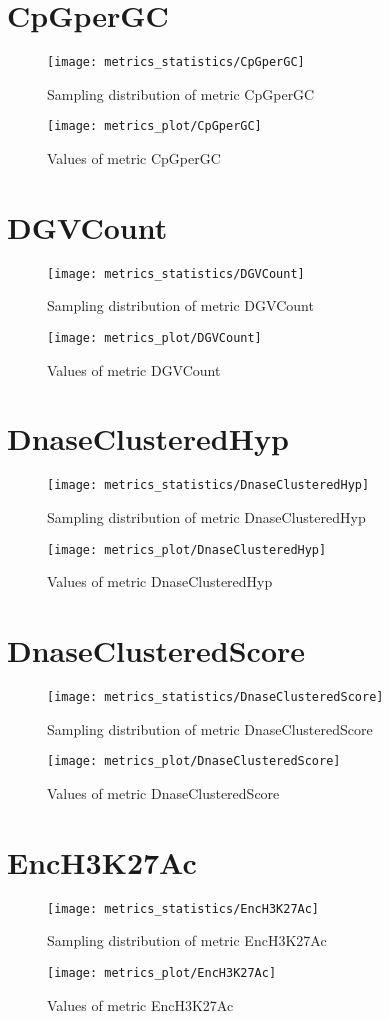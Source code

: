 \section{CpGperGC}
\begin{figure}
  \texttt{[image: metrics\_statistics/CpGperGC]}
  \caption{Sampling distribution of metric CpGperGC}
\end{figure}
\begin{figure}
  \texttt{[image: metrics\_plot/CpGperGC]}
  \caption{Values of metric CpGperGC}
\end{figure}
\section{DGVCount}
\begin{figure}
  \texttt{[image: metrics\_statistics/DGVCount]}
  \caption{Sampling distribution of metric DGVCount}
\end{figure}
\begin{figure}
  \texttt{[image: metrics\_plot/DGVCount]}
  \caption{Values of metric DGVCount}
\end{figure}
\section{DnaseClusteredHyp}
\begin{figure}
  \texttt{[image: metrics\_statistics/DnaseClusteredHyp]}
  \caption{Sampling distribution of metric DnaseClusteredHyp}
\end{figure}
\begin{figure}
  \texttt{[image: metrics\_plot/DnaseClusteredHyp]}
  \caption{Values of metric DnaseClusteredHyp}
\end{figure}
\section{DnaseClusteredScore}
\begin{figure}
  \texttt{[image: metrics\_statistics/DnaseClusteredScore]}
  \caption{Sampling distribution of metric DnaseClusteredScore}
\end{figure}
\begin{figure}
  \texttt{[image: metrics\_plot/DnaseClusteredScore]}
  \caption{Values of metric DnaseClusteredScore}
\end{figure}
\section{EncH3K27Ac}
\begin{figure}
  \texttt{[image: metrics\_statistics/EncH3K27Ac]}
  \caption{Sampling distribution of metric EncH3K27Ac}
\end{figure}
\begin{figure}
  \texttt{[image: metrics\_plot/EncH3K27Ac]}
  \caption{Values of metric EncH3K27Ac}
\end{figure}
